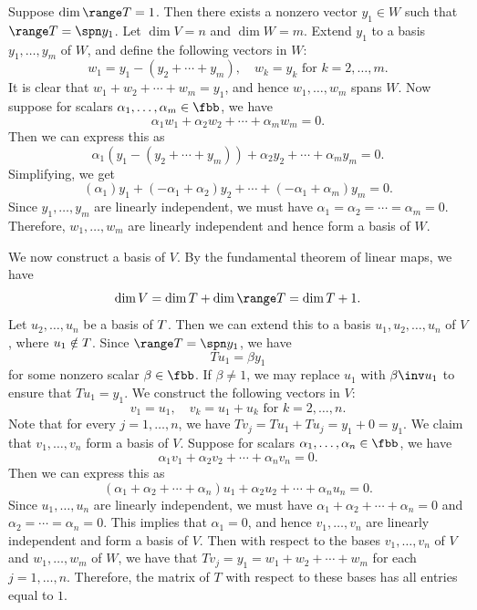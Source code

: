 \begin{sol}
    Suppose $\dim \range T = 1$.
	Then there exists a nonzero vector $y_1 \in W$ such that $\range T = \spn y_1$.
	Let $\dim V = n$ and $\dim W = m$.
	Extend $y_1$ to a basis $y_1, \ldots, y_m$ of $W$, and define the following vectors in $W$:
    \[
    	w_1 = y_1 - (y_2 + \cdots + y_m), \quad w_k = y_k \text{ for } k = 2, \ldots, m.
    \]
    It is clear that $w_1 + w_2 + \cdots + w_m = y_1$, and hence $w_1, \ldots, w_m$ spans $W$.
	Now suppose for scalars $\alpha_1, \ldots, \alpha_m \in \fbb$, we have
    \[
    	\alpha_1 w_1 + \alpha_2 w_2 + \cdots + \alpha_m w_m = 0.
    \]
    Then we can express this as
    \[
    	\alpha_1(y_1 - (y_2 + \cdots + y_m)) + \alpha_2 y_2 + \cdots + \alpha_m y_m = 0.
    \]
    Simplifying, we get
    \[
    	(\alpha_1) y_1 + (-\alpha_1 + \alpha_2) y_2 + \cdots + (-\alpha_1 + \alpha_m) y_m = 0.
    \]
    Since $y_1, \ldots, y_m$ are linearly independent, we must have $\alpha_1 = \alpha_2 = \cdots = \alpha_m = 0$.
	Therefore, $w_1, \ldots, w_m$ are linearly independent and hence form a basis of $W$.

    We now construct a basis of $V$.
	By the fundamental theorem of linear maps, we have
    \[
    	\dim V = \dim \null T + \dim \range T = \dim \null T + 1.
    \]
    Let $u_2, \ldots, u_n$ be a basis of $\null T$.
	Then we can extend this to a basis $u_1, u_2, \ldots, u_n$ of $V$, where $u_1 \notin \null T$.
	Since $\range T = \spn y_1$, we have
    \[
    	Tu_1 = \beta y_1
    \]
    for some nonzero scalar $\beta \in \fbb$.
	If $\beta \neq 1$, we may replace $u_1$ with $\beta\inv u_1$ to ensure that $Tu_1 = y_1$.
	We construct the following vectors in $V$:
    \[
    	v_1 = u_1, \quad v_k = u_1 + u_k \text{ for } k = 2, \ldots, n.
    \]
    Note that for every $j = 1, \ldots, n$, we have $Tv_j = Tu_1 + Tu_j = y_1 + 0 = y_1$.
	We claim that $v_1, \ldots, v_n$ form a basis of $V$.
	Suppose for scalars $\alpha_1, \ldots, \alpha_n \in \fbb$, we have
    \[
    	\alpha_1 v_1 + \alpha_2 v_2 + \cdots + \alpha_n v_n = 0.
    \]
    Then we can express this as
    \[
    	(\alpha_1 + \alpha_2 + \cdots + \alpha_n) u_1 + \alpha_2 u_2 + \cdots + \alpha_n u_n = 0.
    \]
    Since $u_1, \ldots, u_n$ are linearly independent, we must have $\alpha_1 + \alpha_2 + \cdots + \alpha_n = 0$ and $\alpha_2 = \cdots = \alpha_n = 0$.
	This implies that $\alpha_1 = 0$, and hence $v_1, \ldots, v_n$ are linearly independent and form a basis of $V$.
	Then with respect to the bases $v_1, \ldots, v_n$ of $V$ and $w_1, \ldots, w_m$ of $W$, we have that $Tv_j = y_1 = w_1 + w_2 + \cdots + w_m$ for each $j = 1, \ldots, n$.
	Therefore, the matrix of $T$ with respect to these bases has all entries equal to $1$.


\end{sol}
